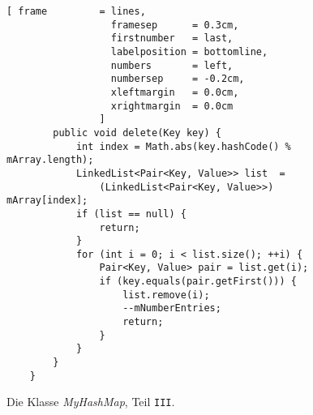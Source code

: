 \begin{figure}[!ht] 
  \centering
\begin{Verbatim}[ frame         = lines, 
                  framesep      = 0.3cm, 
                  firstnumber   = last,
                  labelposition = bottomline,
                  numbers       = left,
                  numbersep     = -0.2cm,
                  xleftmargin   = 0.0cm,
                  xrightmargin  = 0.0cm
                ]
        public void delete(Key key) {
            int index = Math.abs(key.hashCode() % mArray.length);
            LinkedList<Pair<Key, Value>> list  = 
                (LinkedList<Pair<Key, Value>>) mArray[index];
            if (list == null) {
                return;
            }
            for (int i = 0; i < list.size(); ++i) {
                Pair<Key, Value> pair = list.get(i);
                if (key.equals(pair.getFirst())) {
                    list.remove(i);
                    --mNumberEntries;
                    return;
                }
            }
        }
    }
\end{Verbatim}
\vspace*{-0.3cm}
  \caption{Die Klasse \textsl{MyHashMap}, Teil \texttt{III}.}
  \label{fig:MyHashMap-III}
\end{figure}


